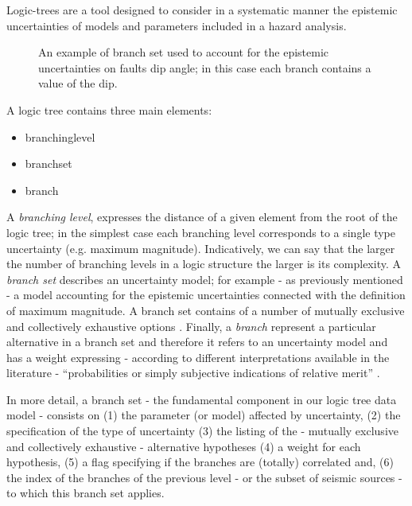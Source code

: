 Logic-trees are a tool designed to consider in a systematic manner the 
epistemic uncertainties of models and parameters included in a hazard 
analysis.
\renewcommand{\psedge}{\ncdiag[armA=0,angleB=180,armB=1cm]}
\begin{figure}[!hb]

\caption{An example of branch set used to account for the epistemic 
uncertainties on faults dip angle; in this case each branch contains a value 
of the dip.}
\label{fig:logic_tree_branching_levels}
\end{figure}

A logic tree cont\-ains three main elements:
\begin{itemize}
\item \gls{branchinglevel}
\item \gls{branchset}
\item \gls{branch}
\end{itemize}
%
A \emph{branching level}, expresses the distance of a given element from the 
root of the logic tree; in the simplest case each branching level corresponds 
to a single type uncertainty (e.g. maximum magnitude). 
Indicatively, we can say that the larger the number of branching levels in a 
logic structure the larger is its complexity.
%
A \emph{branch set} describes an uncertainty model; for example - as previously 
mentioned - a model accounting for the epistemic uncertainties connected with 
the definition of maximum magnitude. A branch set contains of a number of 
mutually exclusive and collectively exhaustive options \citep{bommer2008}. 
%
Finally, a \emph{branch} represent a particular alternative in a branch set and 
therefore it refers to an uncertainty model and has a weight expressing - 
according to different interpretations available in the literature 
- ``probabilities or simply subjective indications of relative merit'' 
\citep[][page 999]{bommer2008}.

%
In more detail, a branch set - the fundamental component in our logic tree data 
model - consists on (1) the parameter (or model) affected 
by uncertainty, (2) the specification of the type of uncertainty (3) the 
listing of the - mutually exclusive and collectively exhaustive 
- alternative hypotheses (4) a weight for each hypothesis, 
(5) a flag specifying if the branches are (totally) correlated and, (6) the 
index of the branches of the previous level - or the subset of seismic 
sources - to which this branch set applies.

